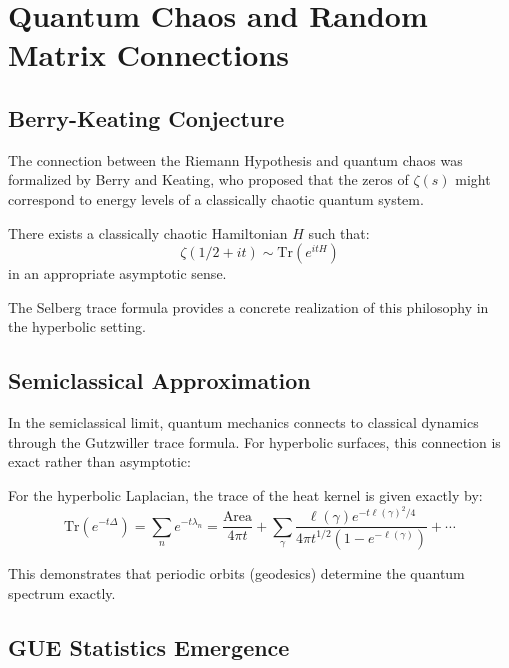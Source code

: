 \section{Quantum Chaos and Random Matrix Connections}
\label{sec:quantum_chaos}

\subsection{Berry-Keating Conjecture}

The connection between the Riemann Hypothesis and quantum chaos was formalized by Berry and Keating, who proposed that the zeros of $\zeta(s)$ might correspond to energy levels of a classically chaotic quantum system.

\begin{conjecture}
\label{conj:berry_keating}
There exists a classically chaotic Hamiltonian $H$ such that:
$$\zeta(1/2 + it) \sim \text{Tr}(e^{itH})$$
in an appropriate asymptotic sense.
\end{conjecture}

The Selberg trace formula provides a concrete realization of this philosophy in the hyperbolic setting.

\subsection{Semiclassical Approximation}

In the semiclassical limit, quantum mechanics connects to classical dynamics through the Gutzwiller trace formula. For hyperbolic surfaces, this connection is exact rather than asymptotic:

\begin{theorem}
\label{thm:gutzwiller_selberg}
For the hyperbolic Laplacian, the trace of the heat kernel is given exactly by:
$$\text{Tr}(e^{-t\Delta}) = \sum_n e^{-t\lambda_n} = \frac{\text{Area}}{4\pi t} + \sum_{\gamma} \frac{\ell(\gamma) e^{-t\ell(\gamma)^2/4}}{4\pi t^{1/2}(1-e^{-\ell(\gamma)})} + \cdots$$
\end{theorem}

This demonstrates that periodic orbits (geodesics) determine the quantum spectrum exactly.

\subsection{GUE Statistics Emergence}

